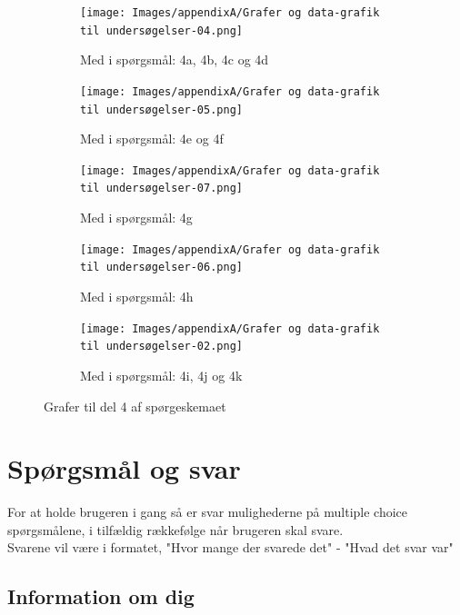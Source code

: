 \begin{figure}[H]
    \centering
    \begin{subfigure}[b]{0.45\textwidth}
        \centering
        \texttt{[image: Images/appendixA/Grafer og data-grafik til undersøgelser-04.png]}
        \caption[Graf 1 til spørgeskema del 4]{Med i spørgsmål: 4a, 4b, 4c og 4d}
    \end{subfigure}
    \hfill
    \begin{subfigure}[b]{0.45\textwidth}
        \centering
        \texttt{[image: Images/appendixA/Grafer og data-grafik til undersøgelser-05.png]}
        \caption[Graf 2 til spørgeskema del 4]{Med i spørgsmål: 4e og 4f}
    \end{subfigure}
    \hfill
    \begin{subfigure}[b]{0.45\textwidth}
        \centering
        \texttt{[image: Images/appendixA/Grafer og data-grafik til undersøgelser-07.png]}
        \caption[Graf 3 til spørgeskema del 4]{Med i spørgsmål: 4g}
    \end{subfigure}
    \hfill
    \begin{subfigure}[b]{0.45\textwidth}
        \centering
        \texttt{[image: Images/appendixA/Grafer og data-grafik til undersøgelser-06.png]}
        \caption[Graf 4 til spørgeskema del 4]{Med i spørgsmål: 4h}
    \end{subfigure}
    \hfill
    \begin{subfigure}[b]{0.45\textwidth}
        \centering
        \texttt{[image: Images/appendixA/Grafer og data-grafik til undersøgelser-02.png]}
        \caption[Graf 5 til spørgeskema del 4]{Med i spørgsmål: 4i, 4j og 4k}
    \end{subfigure}
    \caption{Grafer til del 4 af spørgeskemaet}
    \label{fig:survey:graphs2}
\end{figure}

\section{Spørgsmål og svar}
For at holde brugeren i gang så er svar mulighederne på multiple choice spørgsmålene, i tilfældig rækkefølge når brugeren skal svare.\\
Svarene vil være i formatet, "Hvor mange der svarede det" - "Hvad det svar var"
\subsection{Information om dig}
